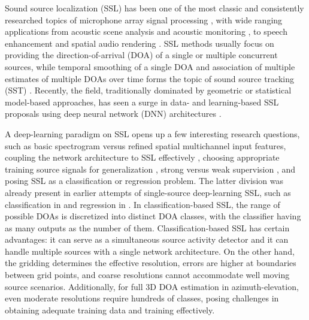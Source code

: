 \documentclass[conference]{IEEEtran}
\begin{document}
    Sound source localization (SSL) has been one of the most classic and consistently researched topics of microphone array signal processing \cite{brandstein2001microphone}, with wide ranging applications from acoustic scene analysis \cite{politis2020overview} and acoustic monitoring \cite{valenzise2007scream}, to speech enhancement \cite{dibiase2001robust} and spatial audio rendering \cite{pulkki2018parametric}. SSL methods usually focus on providing the direction-of-arrival (DOA) of a single or multiple concurrent sources, while temporal smoothing of a single DOA and association  of multiple estimates of multiple DOAs over time forms the topic of sound source tracking (SST) \cite{dibiase2001robust}. Recently, the field, traditionally dominated by geometric or statistical model-based approaches, has seen a surge in data- and learning-based SSL proposals using deep neural network (DNN) architectures \cite{wang2018robust, adavanne2018direction, adavanne2018sound, perotin2019crnn, chakrabarty2019multi, nguyen2020robust, diaz2020robust, bianco2020semi}.
    
    A deep-learning paradigm on SSL opens up a few interesting research questions, such as basic spectrogram\cite{adavanne2018sound, chakrabarty2019multi} versus refined spatial \cite{perotin2019crnn, nguyen2020robust}  multichannel input features, coupling the network architecture to SSL effectively \cite{chakrabarty2019multi, krause2021comparison}, choosing appropriate training source signals for generalization \cite{chakrabarty2019multi, vargas2021improved}, strong versus weak supervision \cite{bianco2020semi}, and posing SSL as a classification \cite{adavanne2018direction, chakrabarty2019multi, perotin2019crnn, nguyen2020robust} or regression \cite{adavanne2018sound, diaz2020robust, perotin2019regression} problem. The latter division was already present in earlier attempts of single-source deep-learning SSL, such as classification in \cite{xiao2015learning} and regression in \cite{vesperini2016neural}. In classification-based SSL, the range of possible DOAs is discretized into distinct DOA classes, with the classifier having as many outputs as the number of them. Classification-based SSL has certain advantages: it can serve as a simultaneous source activity detector and it can handle multiple sources with a single network architecture. On the other hand, the gridding determines the effective resolution, errors are higher at boundaries between grid points, and coarse resolutions cannot accommodate well moving source scenarios. Additionally, for full 3D DOA estimation in azimuth-elevation, even moderate resolutions require hundreds of classes, posing challenges in obtaining adequate training data and training effectively.
    
\end{document}
